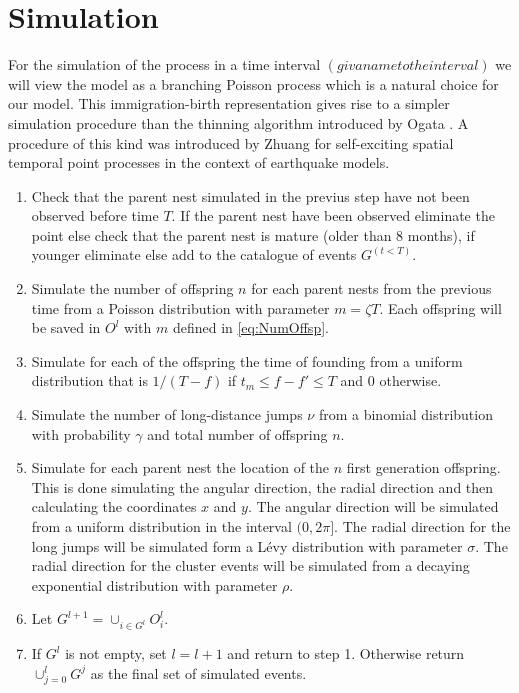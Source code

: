 \documentclass[11pt,a4paper]{article}
\begin{document}
{\color{red}\section{Simulation}

For the simulation of the process in a time interval $(givanametotheinterval)$ we will view the model as a branching Poisson process \cite{Lewis} which is a natural choice for our model. This immigration-birth representation gives rise to a simpler simulation procedure than the thinning algorithm introduced by Ogata \cite{Ogata}. A procedure of this kind was introduced by Zhuang \cite{Zhuang} for self-exciting spatial temporal point processes in the context of earthquake models.

\begin{enumerate}
    \item Check that the parent nest simulated in the previus step have not been observed before time $T$. If the parent nest have been observed eliminate the point else check that the parent nest is mature (older than 8 months), if younger eliminate else add to the catalogue of events $G^{(t<T)}$.
    \item Simulate the number of offspring $n$ for each parent nests from the previous time from a Poisson distribution with parameter $ m = \zeta T$. Each offspring will be saved in $O^l$ with $m$  defined in \ref{eq:NumOffsp}.
    \item Simulate for each of the offspring the time of founding from a uniform distribution that is $1/(T-f)$ if $t_m \leq f - f' \leq T $ and $0$ otherwise.
    \item Simulate the number of long-distance jumps $\nu$ from a binomial distribution with probability $\gamma$ and total number of offspring $n$.
    \item Simulate for each parent nest the location of the $n$ first generation offspring. This is done simulating the angular direction, the radial direction and then calculating the coordinates $x$ and $y$. The angular direction will be simulated from a uniform distribution in the interval $(0, 2\pi]$. The radial direction for the long jumps will be simulated form a L\'evy distribution with parameter $\sigma$. The radial direction for the cluster events will be simulated from a decaying exponential distribution with parameter $\rho$. 
    \item Let $G^{l+1} = \cup_{i\in G^l} O_i^l$.
    \item If $G^l$ is not empty, set $l = l+1$ and return to step 1. Otherwise return $\cup_{j=0}^l G^j$ as the final set of simulated events.
\end{enumerate}

}
\end{document}
